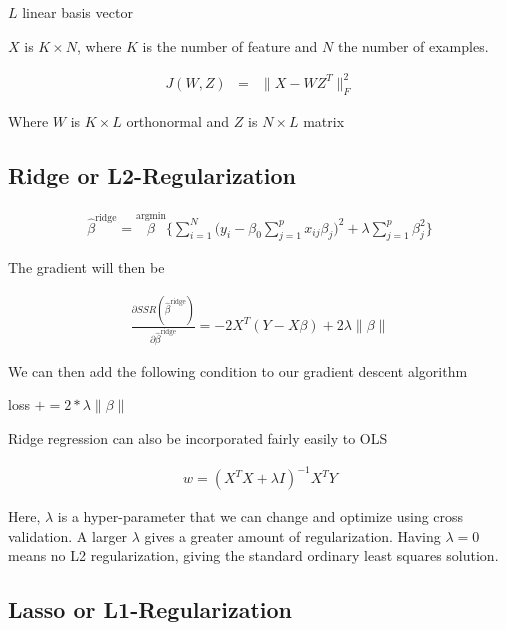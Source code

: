 \documentclass[conference]{IEEEtran}\usepackage[]{graphicx}\usepackage[]{color}
\begin{document}
$L$ linear basis vector

$X$ is $K \times N$, where $K$ is the number of feature and $N$ the number of
examples. 

\begin{eqnarray}
  J(W, Z) &=& \| X - WZ^T\|_F^2
\end{eqnarray}

Where $W$ is $K \times L$ orthonormal and $Z$ is $N \times L$ matrix

\cite{murphy2012machine}
\cite{scikit-learn}

\subsection{Ridge or L2-Regularization}



\begin{eqnarray}
  \hat{\beta}^{\text{ridge}} = \stackrel{\text{argmin}}{\beta}
  \Bigg\{ \sum_{i=1}^N \bigg(y_i - \beta_0 \sum_{j=1}^p x_{ij} \beta_j \bigg)^2 +
  \lambda \sum_{j=1}^p \beta_j^2 \Bigg\}
\end{eqnarray}
\cite{hastie2005elements}

The gradient will then be 

\begin{eqnarray}
  \frac{\partial SSR(\hat{\beta}^{\text{ridge}} )}{\partial
  \hat{\beta}^{\text{ridge}}} = -2 X^T (Y-X \beta) + 2 \lambda \| \beta \|
\end{eqnarray}

We can then add the following condition to our gradient descent algorithm

\begin{algorithmic}
  \State loss $+= 2 * \lambda \| \beta \|$
  \EndIf
\end{algorithmic}


Ridge regression can also be incorporated fairly easily to OLS 

\begin{eqnarray}
 w = (X^TX + \lambda I)^{-1}X^TY
\end{eqnarray}

Here, $\lambda$ is a hyper-parameter that we can change and optimize using cross validation. A larger $\lambda$ gives a greater amount of regularization. Having $\lambda = 0$ means no L2 regularization, giving the standard ordinary least squares solution.

\subsection{Lasso or L1-Regularization}
\end{document}
